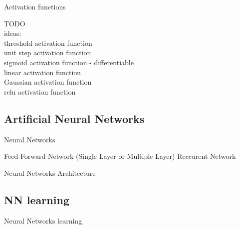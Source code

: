 \documentclass[12pt,serif,mathserif,compress]{beamer}
\begin{document}
\begin{frame}{Activation functions}

  TODO \\
  ideas:\\
    threshold activation function\\
    unit step activation function\\
    sigmoid activation function - differentiable \\
    linear activation function \\
    Gaussian activation function \\
    relu activation function


\end{frame}

\subsection{Artificial Neural Networks}

\begin{frame}{Neural Networks}

  Feed-Forward Network (Single Layer  or Multiple Layer)
  Reccurent Network
  
\end{frame}

\begin{frame}{Neural Networks Architecture}
  
  
\end{frame}

\subsection{NN learning}

\begin{frame}{Neural Networks learning}
  
\end{frame}
\end{document}
